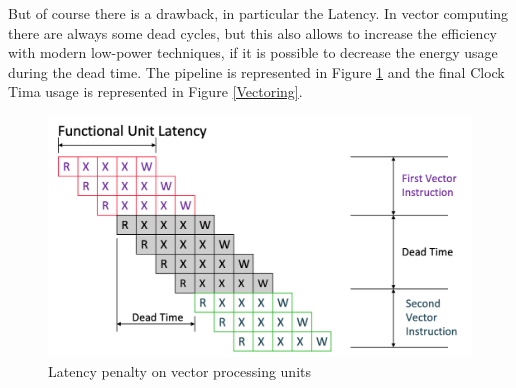 But of course there is a drawback, in particular the Latency. In vector computing there are always some dead cycles, but this also allows to increase the efficiency with modern low-power techniques, if it is possible to decrease the energy usage during the dead time.
The pipeline is represented in Figure \ref{Vector-Latency} and the final Clock Tima usage is represented in Figure \ref{Vectoring}.

\begin{figure}[H]
    \centering
    \includegraphics[scale = 0.4]{Chapter_1/img/vectoring.png}
    \caption{Latency penalty on vector processing units \cite{L15-Krste}}
    \label{Vector-Latency}
\end{figure}

